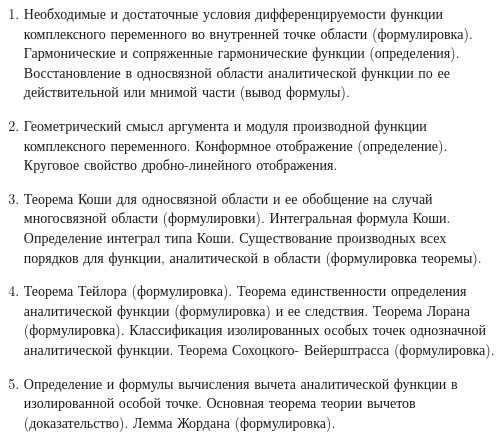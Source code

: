 % 
%

\begin{enumerate}

\item Необходимые и достаточные условия дифференцируемости функции комплексного переменного во внутренней точке области (формулировка). Гармонические и сопряженные гармонические функции (определения). Восстановление в односвязной области  аналитической функции по ее действительной или мнимой части (вывод формулы). 

\item Геометрический смысл  аргумента и модуля  производной функции комплексного переменного.
Конформное отображение (определение). Круговое свойство дробно-линейного отображения.

\item Теорема Коши для односвязной области и ее обобщение на случай многосвязной области (формулировки). Интегральная формула Коши. Определение интеграл типа Коши. Существование производных всех порядков для функции, аналитической в области (формулировка теоремы).

\item Теорема Тейлора (формулировка). Теорема единственности определения аналитической функции (формулировка) и ее следствия. Теорема Лорана (формулировка). Классификация изолированных особых точек однозначной аналитической функции. Теорема Сохоцкого- Вейерштрасса (формулировка).

\item Определение и формулы вычисления вычета  аналитической функции в изолированной особой точке. Основная теорема теории вычетов (доказательство). Лемма Жордана (формулировка).


\end{enumerate}
